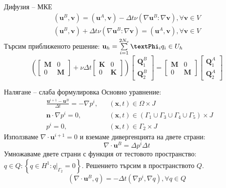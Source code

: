 \documentclass{beamer}
\newcommand{\dotprod}[2]{\left(#1, #2\right)}
\newcommand{\divg}[1]{\nabla\cdot#1}
\newcommand{\grad}[1]{\nabla#1}
\newcommand{\lapl}[1]{\Delta#1}
\newcommand{\vecf}[1]{\textbf{#1}}
\begin{document}
\begin{frame}{Дифузия -- МКЕ}
	\begin{align*}
		\dotprod{\vecf{u}^B}{\vecf{v}} = \dotprod{\vecf{u}^A}{\vecf{v}} - \Delta t \nu\left(\grad{\vecf{u}^B} : \grad{\vecf{v}}\right), \forall\vecf{v} \in V \\
		\dotprod{\vecf{u}^B}{\vecf{v}} + \Delta t \nu\left(\grad{\vecf{u}^B} : \grad{\vecf{v}}\right) = \dotprod{\vecf{u}^A}{\vecf{v}}, \forall\vecf{v} \in V
	\end{align*}
	Търсим приближеното решение: $\vecf{u}_h = \sum\limits_{i=1}^{2N_v}{\textbf{\textPhi}_iq_i} \in U_h$
	$$
	\left(\begin{bmatrix}
		\mathbf{M} & 0 \\
		0 & \mathbf{M}
	\end{bmatrix} + \nu\Delta t\begin{bmatrix}
		\mathbf{K} & 0 \\
		0 & \mathbf{K}
	\end{bmatrix}\right)\begin{bmatrix}
		\vecf{Q}^{B}_1 \\
		\vecf{Q}^{B}_2
	\end{bmatrix} = \begin{bmatrix}
		\mathbf{M} & 0 \\
		0 & \mathbf{M}
	\end{bmatrix}\begin{bmatrix}
		\vecf{Q}^{A}_1 \\
		\vecf{Q}^{A}_2
	\end{bmatrix}
	$$

\end{frame}

\begin{frame}{Налягане -- слаба формулировка}
	Основно уравнение:
	\begin{align*}
		&\frac{\vecf{u}^{i+1} - \vecf{u}^B}{\Delta t} = -\nabla p^i, &&\left(\vecf{x}, t\right) \in \Omega \times J\\
		&\vecf{n} \cdot \grad{p^i} = 0, && \left(\vecf{x}, t\right) \in (\Gamma_1 \cup \Gamma_3 \cup \Gamma_4 \cup \Gamma_5) \times J \\
		&p^i = 0, && \left(\vecf{x}, t\right) \in \Gamma_2 \times J
	\end{align*}
	Използваме $\nabla \cdot \textbf{u}^{i+1} = 0$ и вземаме дивергенцията на двете страни:
	$$
		\divg{\vecf{u}^B} = \lapl{p^i} \Delta t
	$$
	Умножаваме двете страни с функция от тестовото пространство: $q \in Q : \left\{q \in H^1 : q|_{\Gamma_2} = 0\right\}$. Решението търсим в пространството $Q$.
	$$
		\dotprod{\divg{\vecf{u}^B}}{q} = - \Delta t \dotprod{\grad{p^i}}{\grad{q}}, \forall q \in Q
	$$
\end{frame}
\end{document}
